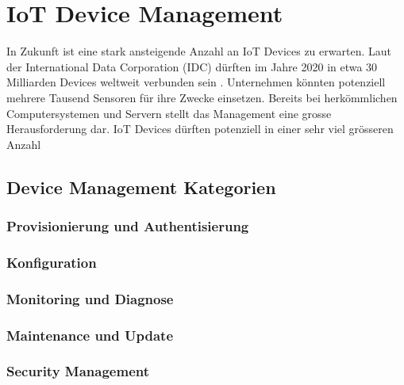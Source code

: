 \chapter{IoT Device Management}
In Zukunft ist eine stark ansteigende Anzahl an IoT Devices zu erwarten. Laut der International Data Corporation (IDC) dürften im Jahre 2020 in etwa 30 Milliarden Devices weltweit verbunden sein \cite{IDC15}. Unternehmen könnten potenziell mehrere Tausend Sensoren für ihre Zwecke einsetzen. Bereits bei herkömmlichen Computersystemen und Servern stellt das Management eine grosse Herausforderung dar. IoT Devices dürften potenziell in einer sehr viel grösseren Anzahl 
\section{Device Management Kategorien}

\subsection{Provisionierung und Authentisierung}
\subsection{Konfiguration}
\subsection{Monitoring und Diagnose}
\subsection{Maintenance und Update}
\subsection{Security Management}

\section{}




















